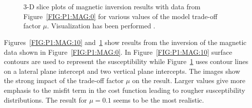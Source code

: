 \begin{figure}
    \begin{center}
        \\ %
        \\ %
    \end{center}
    \caption{3-D slice plots of magnetic inversion results with data from
    Figure~\ref{FIG:P1:MAG:0} for various values of the model trade-off
    factor $\mu$. Visualization has been performed \VisIt.}
    \label{FIG:P1:MAG:11}
\end{figure}

Figures~\ref{FIG:P1:MAG:10} and~\ref{FIG:P1:MAG:11} show results from the
inversion of the magnetic data shown in Figure~\ref{FIG:P1:MAG:0}.
In Figure~\ref{FIG:P1:MAG:10} surface contours are used to represent the
susceptibility while Figure~\ref{FIG:P1:MAG:11} uses contour lines
on a lateral plane intercept and two vertical plane intercepts.
The images show the strong impact of the trade-off factor $\mu$ on the result.
Larger values give more emphasis to the misfit term in the cost function
leading to rougher susceptibility distributions.
The result for $\mu=0.1$ seems to be the most realistic.

